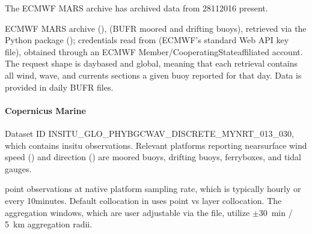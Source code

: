 \documentclass[a4paper,10pt,english]{sphinxmanual}
\begin{document}
\sphinxAtStartPar
The ECMWF MARS archive has archived data from 28\sphinxhyphen{}11\sphinxhyphen{}2016 \sphinxhyphen{} present.

\sphinxAtStartPar
{}

\sphinxAtStartPar
ECMWF MARS archive (),  (BUFR moored and drifting buoys), retrieved via the  Python package (); credentials read from  (ECMWF’s standard Web API key file), obtained through an ECMWF Member/Co\sphinxhyphen{}operating\sphinxhyphen{}State\sphinxhyphen{}affiliated account. The request shape is day\sphinxhyphen{}based and global, meaning that each retrieval contains all wind, wave, and currents sections a given buoy reported for that day. Data is provided in daily BUFR files.


\paragraph{Copernicus Marine}
\label{\detokenize{05_reference_datasets:copernicus-marine}}\label{\detokenize{05_reference_datasets:subpar-cmems-insitu}}
\sphinxAtStartPar
{}

\sphinxAtStartPar
Dataset ID INSITU\_GLO\_PHYBGCWAV\_DISCRETE\_MYNRT\_013\_030, which contains in\sphinxhyphen{}situ observations. Relevant platforms reporting near\sphinxhyphen{}surface wind speed () and direction () are moored buoys, drifting buoys, ferryboxes, and tidal gauges.

\sphinxAtStartPar
{}

\sphinxAtStartPar
point observations at native platform sampling rate, which is typically hourly or every 10\sphinxhyphen{}minutes. Default collocation in  uses point vs layer collocation. The aggregation windows, which are user adjustable via the  file, utilize \(\pm\)30 min / 5 km aggregation radii.

\sphinxAtStartPar
{}
\end{document}
